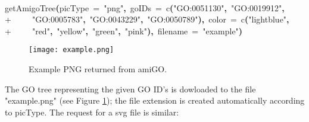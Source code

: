 \documentclass[a4paper,11pt]{article}
\newcommand{\hlfunctioncall}[1]{\textcolor[rgb]{1,0,0}{#1}}%
\newcommand{\hlstring}[1]{\textcolor[rgb]{0.6,0.6,1}{#1}}%
\newcommand{\hlkeyword}[1]{\textcolor[rgb]{0,0,0}{\textbf{#1}}}%
\newcommand{\hlargument}[1]{\textcolor[rgb]{0.694117647058824,0.247058823529412,0.0196078431372549}{#1}}%
\newcommand{\hlprompt}[1]{\textcolor[rgb]{0,0,0}{#1}}%
\newcommand{\hlstd}[1]{\textcolor[rgb]{0,0,0}{#1}}%
\newenvironment{Houtput}{\raggedright}{%
%
}
\begin{document}
\begin{Houtput}
\hspace*{\fill}\\
\hlstd{}\ttfamily\noindent
\hlprompt{\usebox{\hlnormalsizeboxgreaterthan}{\ }}\hlfunctioncall{getAmigoTree}\hlkeyword{(}\hlargument{picType}{\ }\hlargument{=}{\ }\hlstring{"png"}\hlkeyword{,}{\ }\hlargument{goIDs}{\ }\hlargument{=}{\ }\hlfunctioncall{c}\hlkeyword{(}\hlstring{"GO:0051130"}\hlkeyword{,}{\ }\hlstring{"GO:0019912"}\hlkeyword{,}\hspace*{\fill}\\
\hlstd{}\hlprompt{+{\ }}{\ }{\ }{\ }{\ }\hlstring{"GO:0005783"}\hlkeyword{,}{\ }\hlstring{"GO:0043229"}\hlkeyword{,}{\ }\hlstring{"GO:0050789"}\hlkeyword{)}\hlkeyword{,}{\ }\hlargument{color}{\ }\hlargument{=}{\ }\hlfunctioncall{c}\hlkeyword{(}\hlstring{"lightblue"}\hlkeyword{,}\hspace*{\fill}\\
\hlstd{}\hlprompt{+{\ }}{\ }{\ }{\ }{\ }\hlstring{"red"}\hlkeyword{,}{\ }\hlstring{"yellow"}\hlkeyword{,}{\ }\hlstring{"green"}\hlkeyword{,}{\ }\hlstring{"pink"}\hlkeyword{)}\hlkeyword{,}{\ }\hlargument{filename}{\ }\hlargument{=}{\ }\hlstring{"example"}\hlkeyword{)}\mbox{}
\normalfont
\hspace*{\fill}\\
\hlstd{}
\end{Houtput}

\begin{figure}[h!]
\centering
\texttt{[image: example.png]}
\caption{Example PNG returned from amiGO.}
\label{fig:amiGOpng}
\end{figure}

The GO tree representing the given GO ID's is dowloaded to the file "example.png" (see Figure \ref{fig:amiGOpng}); the file extension is created automatically according to picType. The request for a svg file is similar:
\end{document}

